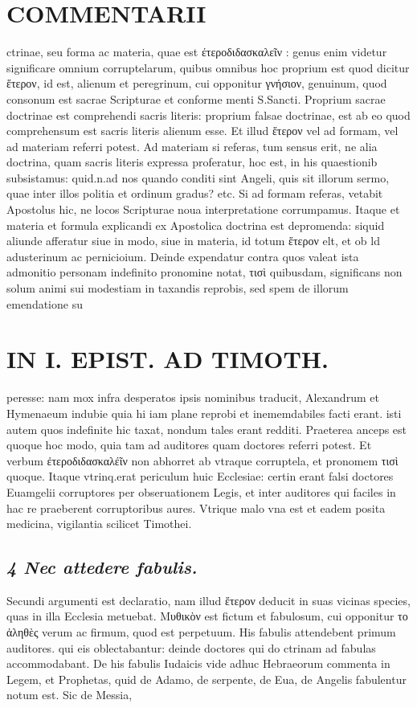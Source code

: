 \documentclass{article}
\begin{document}
\begin{pages}
\section*{COMMENTARII }
\marginpar{[ p.18 ]}\pstart ctrinae, seu forma ac materia, quae est έτεροδιδασκαλεῖν : genus enim videtur significare omnium corruptelarum, quibus omnibus hoc proprium est quod dicitur ἕτερον, id est, alienum et peregrinum, cui opponitur γνήσιον, genuinum, quod consonum est sacrae Scripturae et conforme menti S.Sancti. Proprium sacrae doctrinae est comprehendi sacris literis: proprium falsae doctrinae, est ab eo quod comprehensum est sacris literis alienum esse. Et illud ἕτερον vel ad formam, vel ad materiam referri potest. Ad materiam si referas, tum sensus erit, ne alia doctrina, quam sacris literis expressa proferatur, hoc est, in his quaestionib subsistamus: quid.n.ad nos quando conditi sint Angeli, quis sit illorum sermo, quae inter illos politia et ordinum gradus? etc. Si ad formam referas, vetabit Apostolus hic, ne locos Scripturae noua interpretatione corrumpamus. Itaque et materia et formula explicandi ex Apostolica doctrina est depromenda: siquid aliunde afferatur siue in modo, siue in materia, id totum ἕτερον elt, et ob ld adusterinum ac pernicioium.  \pend\pstart Deinde expendatur contra quos valeat ista admonitio personam indefinito pronomine notat, τισὶ quibusdam, significans non solum animi sui modestiam in taxandis reprobis, sed spem de illorum emendatione su\pend
\section*{IN I. EPIST. AD TIMOTH. }
\marginpar{[ p.19 ]}\pstart peresse: nam mox infra desperatos ipsis nominibus traducit, Alexandrum et Hymenaeum indubie quia hi iam plane reprobi et inememdabiles facti erant. isti autem quos indefinite hic taxat, nondum tales erant redditi. Praeterea anceps est quoque hoc modo, quia tam ad auditores quam doctores referri potest. Et verbum ἐτεροδιδασκαλέῖν non abhorret ab vtraque corruptela, et pronomem τισὶ quoque. Itaque vtrinq.erat periculum huic Ecclesiae: certin erant falsi doctores Euamgelii corruptores per obseruationem Legis, et inter auditores qui faciles in hac re praeberent corruptoribus aures. Vtrique malo vna est et eadem posita medicina, vigilantia scilicet Timothei.  \pend
{}
{}
\subsection*{\textit{4 Nec attedere fabulis. }}\pstart Secundi argumenti est declaratio, nam illud ἕτερον deducit in suas vicinas species, quas in illa Ecclesia metuebat. Μυθικὸν est fictum et fabulosum, cui opponitur το ἀληθὲς verum ac firmum, quod est perpetuum. His fabulis attendebent primum auditores. qui eis oblectabantur: deinde doctores qui do ctrinam ad fabulas accommodabant. De his fabulis Iudaicis vide adhuc Hebraeorum commenta in Legem, et Prophetas, quid de Adamo, de serpente, de Eua, de Angelis fabulentur notum est. Sic de Messia,  \pend

\end{pages}
\end{document}
